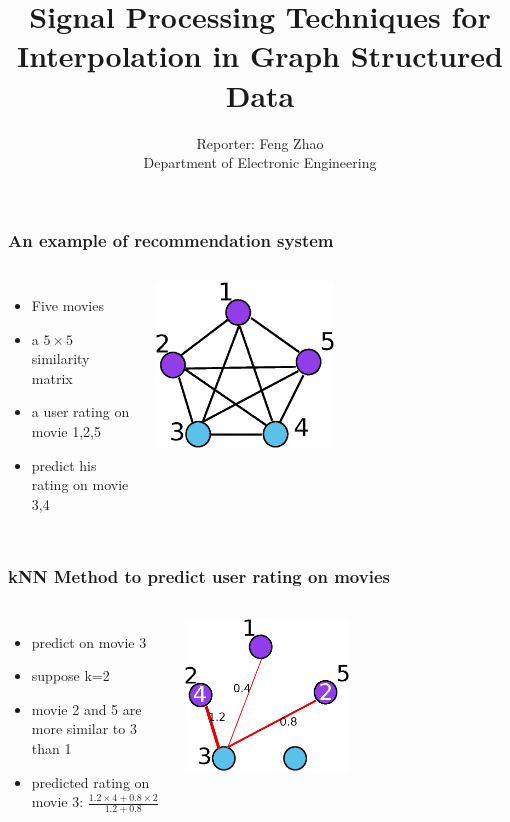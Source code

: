 \documentclass{beamer}
\title{Signal Processing Techniques for Interpolation in Graph Structured Data}
\author{Reporter: Feng Zhao\\Department of Electronic Engineering}
\begin{document}
\begin{frame}
\titlepage
\end{frame}
\begin{frame}
\frametitle{An example of recommendation system}
\begin{columns}
\begin{itemize}
\item Five movies
\item a $5\times 5$ similarity matrix
\item a user rating on movie 1,2,5
\item predict his rating on movie 3,4 
\end{itemize}
\includegraphics[width=0.5\textwidth]{movie5.eps}
\end{columns}
\end{frame}

\begin{frame}
\frametitle{kNN Method to predict user rating on movies}
\begin{columns}
\begin{itemize}
\item predict on movie 3
\item suppose k=2
\item movie 2 and 5 are more similar to 3 than 1
\item predicted rating on movie 3: $\frac{1.2\times 4+0.8\times 2}{1.2+0.8}$
\end{itemize}
\includegraphics[width=0.5\textwidth]{movie5_knn.eps}
\end{columns}
\end{frame}
\end{document}
